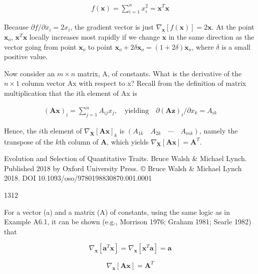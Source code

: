 \documentclass{article}
\begin{document}
\begin{equation}
\begin{align*}f(\mathbf{x})=\sum\limits_{i=1}^n x_i^2=\mathbf{x}^T\mathbf{x}\end{align*}
\end{equation}

Because $\partial f/\partial x_i = 2x_i$, the gradient vector is just $\nabla_{\mathbf{x}}[f(\mathbf{x})] = 2\mathbf{x}$. At the point $\mathbf{x}_o$, $\mathbf{x}^T \mathbf{x}$ locally increases most rapidly if we change $\mathbf{x}$ in the same direction as the vector going from point $\mathbf{x}_o$ to point $\mathbf{x}_o + 2\delta \mathbf{x}_o = (1 + 2\delta) \mathbf{x}_o$, where $\delta$ is a small positive value.

Now consider an  $ m \times n $ matrix, A, of constants. What is the derivative of the  $ n \times 1 $ column vector Ax with respect to x? Recall from the definition of matrix multiplication that the ith element of Ax is

\begin{equation}
\begin{align*}(\mathbf{A}\mathbf{x})_i=\sum\limits_{j=1}^n A_{ij}x_j,\quad\textrm{yielding}\quad\partial(\mathbf{A}\mathbf{z})_i/\partial x_k=A_{ik}\end{align*}
\end{equation}

Hence, the $i$th element of $\nabla_{\mathbf{X}}[\mathbf{A}\mathbf{x}]_{k}$ is $(A_{1k} \quad A_{2k} \quad \cdots \quad A_{mk})$, namely the transpose of the $k$th column of $\mathbf{A}$, which yields $\nabla_{\mathbf{X}}[\mathbf{A}\mathbf{x}] = \mathbf{A}^{T}$.

Evolution and Selection of Quantitative Traits. Bruce Walsh & Michael Lynch. Published 2018 by Oxford University Press. © Bruce Walsh & Michael Lynch 2018. DOI 10.1093/oso/9780198830870.001.0001

1312

For a vector (a) and a matrix (A) of constants, using the same logic as in Example A6.1, it can be shown (e.g., Morrison 1976; Graham 1981; Searle 1982) that

\begin{equation}
\nabla_{\mathbf{x}}\left[\mathbf{a}^{T}\mathbf{x}\right]=\nabla_{\mathbf{x}}\left[\mathbf{x}^{T}\mathbf{a}\right]=\mathbf{a}
\end{equation}

\begin{equation}
\nabla_{\mathbf{x}}\left[\mathbf{A}\mathbf{x}\right]=\mathbf{A}^{T}
\end{equation}
\end{document}
